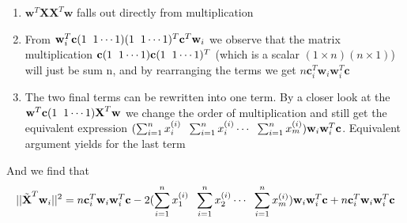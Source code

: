 \documentclass[a4paper,norsk]{article}
\begin{document}
\begin{enumerate}
\item $\textbf{w}^T \textbf{X}\textbf{X}^T\textbf{w}$ falls out directly from multiplication
\item From $\textbf{w}_i^T\textbf{c}(1 \hspace{2mm} 1 \cdots 1)(1 \hspace{2mm} 1 \cdots 1)^T \textbf{c}^T \textbf{w}_i$ \newline 
we observe that the matrix multiplication $\textbf{c}(1 \hspace{2mm} 1 \cdots 1) \textbf{c}(1 \hspace{2mm} 1 \cdots 1)^T$ \newline(which is a scalar $(1 \times n) (n \times 1)$)
will just be sum n, and by rearranging the terms we get $n\textbf{c}_i^T \textbf{w}_i \textbf{w}_i^T \textbf{c}$
\item The two final terms can be rewritten into one term. By a closer look at the $\textbf{w}^T \textbf{c}(1 \hspace{2mm} 1 \cdots 1)\textbf{X}^T \textbf{w}$ we change the order
of multiplication and still get the equivalent expression \newline 
$(\sum_{i=1}^n x_i^{(i)} \hspace{2mm} \sum_{i=1}^n x_i^{(i)} \cdots \hspace{2mm} \sum_{i=1}^n x_m^{(i)})\textbf{w}_i\textbf{w}_i^T\textbf{c}$. Equivalent argument yields for the last term
\end{enumerate}

And we find that
\begin{align*}
||\tilde{\textbf{X}}^T \textbf{w}_i ||^2 = n\textbf{c}_i^T \textbf{w}_i \textbf{w}_i^T \textbf{c} - 
2(\sum_{i=1}^n x_1^{(i)} \hspace{2mm} \sum_{i=1}^n x_2^{(i)} \cdots \hspace{2mm} \sum_{i=1}^n x_m^{(i)})\textbf{w}_i\textbf{w}_i^T\textbf{c} +
n\textbf{c}_i^T \textbf{w}_i \textbf{w}_i^T \textbf{c}
\end{align*}

\newpage
\end{document}
